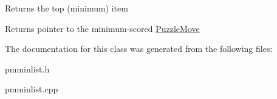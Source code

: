 \-Returns the top (minimum) item \begin{DoxyReturn}{\-Returns}
pointer to the minimum-\/scored \hyperlink{classPuzzleMove}{\-Puzzle\-Move} 
\end{DoxyReturn}


\-The documentation for this class was generated from the following files\-:\begin{DoxyCompactItemize}
\item 
pmminlist.\-h\item 
pmminlist.\-cpp\end{DoxyCompactItemize}
